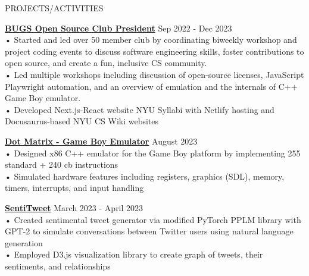 \documentclass{resume} %
\begin{document}

\begin{rSection}{PROJECTS/ACTIVITIES}

\textbf{\href{https://bugs-nyu.github.io/}{BUGS Open Source Club President}} \hfill Sep 2022 - Dec 2023 \\
• Started and led over 50 member club by coordinating biweekly workshop and project coding events to discuss software engineering skills, foster contributions to open source, and create a fun, inclusive CS community.\\
• Led multiple workshops including discussion of open-source licenses, JavaScript Playwright automation, and an overview of emulation and the internals of C++ Game Boy emulator.\\
• Developed Next.js-React website NYU Syllabi with Netlify hosting and Docusaurus-based NYU CS Wiki websites

\textbf{\href{https://github.com/aminoa/dot-matrix}{Dot Matrix - Game Boy Emulator}} \hfill August 2023 \\
• Designed x86 C++ emulator for the Game Boy platform by implementing 255 standard + 240 cb instructions \\
• Simulated hardware features including registers, graphics (SDL), memory, timers, interrupts, and input handling 

\textbf {\href{https://github.com/aminoa/sentitweet/}{SentiTweet}} \hfill March 2023 - April 2023 \\
• Created sentimental tweet generator via modified PyTorch PPLM library with GPT-2 to simulate conversations between Twitter users using natural language generation\\
• Employed D3.js visualization library to create graph of tweets, their sentiments, and relationships 


\end{rSection}
\end{document}
